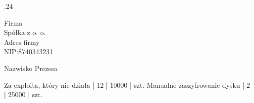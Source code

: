 %




.24

\dla Firma\\Spółka z o. o.\\Adres firmy\\NIP:8740343231

\kto Nazwisko Prezesa



\towar
\artA Za exploita, który nie działa | 12 | 10000 | szt.
\artB Manualne zaszyfrowanie dysku  | 2  | 25000 | szt.


\Fakturuj       %

\bye


